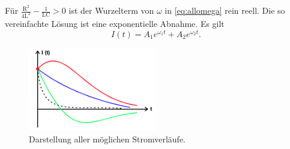 Für $\frac{\mathup{R^2}}{4\mathup{L^2}}-\frac{1}{\mathup{LC}}>0$ 
ist der Wurzelterm von $\omega$ in \eqref{eq:allomega} rein reell.
Die so vereinfachte Lösung ist eine exponentielle Abnahme.
Es gilt
\begin{equation}
	I(t)= A_1 e^{\omega_1 t} + A_2 e^{\omega_2 t}.
\end{equation}
\begin{figure}
	\centering
	\includegraphics[width=0.5\textwidth]{Bilder/Loesungsform.png}
	\caption{Darstellung aller möglichen Stromverläufe. \cite{v354}}
\end{figure}

